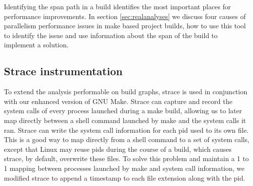 \documentclass[sigconf,10pt,authorversion]{acmart}\settopmatter{printfolios=true,printccs=false,printacmref=false}
\begin{document}
Identifying the span path in a build identifies the most important places for performance
improvements.  In section \ref{sec:realanalyses} we discuss four causes of parallelism
performance issues in make based project builds, how to use this tool to identify the
issue and use information about the span of the build to implement a solution.





\subsection{Strace instrumentation}
\label{sec:straceinstr}

To extend the analysis performable on build graphs, strace \cite{strace4.25} is used in
conjunction with our enhanced version of GNU Make.  Strace can capture and record the system
calls of every process launched during a make build, allowing us to later map directly between
a shell command launched by make and the system calls it ran.  Strace can write the system call
information for each pid used to its own file.  This is a good way to map directly from a
shell command to a set of system calls, except that Linux may reuse pids during the course of
a build, which causes strace, by default, overwrite these files.  To solve this problem and
maintain a 1 to 1 mapping between processes launched by make and system call information,
we modified strace to append a timestamp to each file extension along with the pid.
\end{document}
